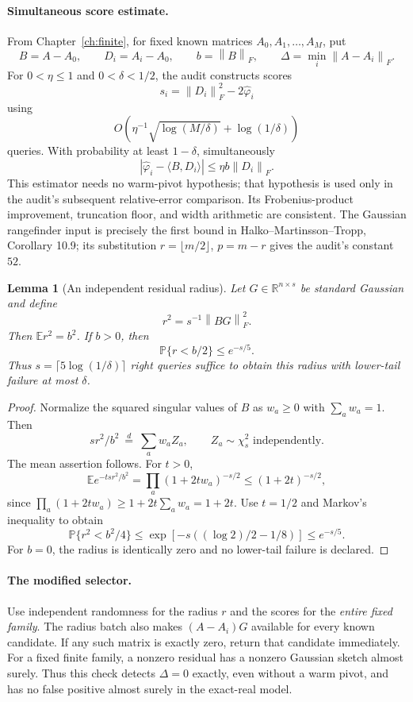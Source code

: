 \documentclass[11pt,oneside,openany,a4paper]{book}
\numberwithin{equation}{chapter}
\newtheorem{lemma}[theorem]{Lemma}
\theoremstyle{definition}
\theoremstyle{remark}
\newcommand{\R}{\mathbb R}\newcommand{\E}{\mathbb E}\newcommand{\Prb}{\mathbb P}\newcommand{\PP}{\mathbb P}
\newcommand{\F}[1]{\left\lVert#1\right\rVert_F}
\begin{document}
\paragraph{Simultaneous score estimate.}
From Chapter~\ref{ch:finite}, for fixed known matrices $A_0,A_1,\ldots,A_M$, put
\[
 B=A-A_0,\qquad D_i=A_i-A_0,\qquad
 b=\F B,\qquad \Delta=\min_i\F{A-A_i}.
\]
For $0<\eta\le1$ and $0<\delta<1/2$, the audit constructs scores
\[
 s_i=\F{D_i}^2-2\widehat\varphi_i
\]
using
\[
 O\!\left(\eta^{-1}\sqrt{\log(M/\delta)}+
                   \log(1/\delta)\right)
\]
queries. With probability at least $1-\delta$, simultaneously
\begin{equation}\label{expected:eq:score}
 |\widehat\varphi_i-\langle B,D_i\rangle|
       \le\eta b\F{D_i}.
\end{equation}
This estimator needs no warm-pivot hypothesis; that hypothesis is used
only in the audit's subsequent relative-error comparison. Its
Frobenius-product improvement, truncation floor, and width arithmetic
are consistent. The Gaussian rangefinder input is precisely the first
bound in Halko--Martinsson--Tropp, Corollary 10.9; its substitution
$r=\lfloor m/2\rfloor$, $p=m-r$ gives the audit's constant $52$.

\begin{lemma}[An independent residual radius]\label{expected:lem:radius}
Let $G\in\R^{n\times s}$ be standard Gaussian and define
\[
 r^2=s^{-1}\F{BG}^2.
\]
Then $\E r^2=b^2$. If $b>0$, then
\[
 \Prb\{r<b/2\}\le e^{-s/5}.
\]
Thus $s=\lceil5\log(1/\delta)\rceil$ right queries suffice
to obtain this radius with lower-tail failure at most $\delta$.
\end{lemma}
\begin{proof}
Normalize the squared singular values of $B$ as $w_a\ge0$ with
$\sum_a w_a=1$. Then
\[
 sr^2/b^2\ \overset{d}=\ \sum_a w_a Z_a,
       \qquad Z_a\sim\chi_s^2\text{ independently}.
\]
The mean assertion follows. For $t>0$,
\[
 \E e^{-tsr^2/b^2}
 =\prod_a(1+2tw_a)^{-s/2}
 \le(1+2t)^{-s/2},
\]
since $\prod_a(1+2tw_a)\ge1+2t\sum_a w_a=1+2t$.
Use $t=1/2$ and Markov's inequality to obtain
\[
 \Prb\{r^2<b^2/4\}
 \le\exp[-s((\log2)/2-1/8)]\le e^{-s/5}.
\]
For $b=0$, the radius is identically zero and no lower-tail
failure is declared.
\end{proof}

\paragraph{The modified selector.}
Use independent randomness for the radius $r$ and the scores for
the \emph{entire fixed family}. The radius batch also makes
$(A-A_i)G$ available for every known candidate. If any such matrix
is exactly zero, return that candidate immediately. For a fixed finite
family, a nonzero residual has a nonzero Gaussian sketch almost surely.
Thus this check detects $\Delta=0$ exactly, even without a warm pivot,
and has no false positive almost surely in the exact-real model.
\end{document}
